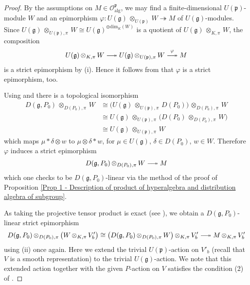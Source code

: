 \documentclass[a4paper, reqno, 10pt]{amsart}
\theoremstyle{definition}
\numberwithin{equation}{section}
\newcommand{\Ad}{{\mathrm{Ad}}}
\newcommand{\blank}{{\,\_\,}}
\newcommand{\botimes}[1]{{\,\otimes_{#1}\,}}
\renewcommand{\dim}{{\mathrm{dim}}}
\newcommand{\mto}{\mapsto}
\newcommand{\CO}{{\mathcal {O}}}
\newcommand{\Fg}{{\mathfrak {g}}}
\newcommand{\Fm}{{\mathfrak {m}}}
\newcommand{\Fp}{{\mathfrak {p}}}
\DeclareRobustCommand\longtwoheadrightarrow
{\relbar\joinrel\twoheadrightarrow}
\newcommand{\alg}{{\mathrm{alg}}}
\begin{document}
\begin{proof}
	By the assumptions on $M \in \CO^\Fp_\alg$, we may find a finite-dimensional $U(\Fp)$-module $W$ and an epimorphism $\varphi \colon U(\Fg) \botimes{U(\Fp)} W \twoheadrightarrow M$ of $U(\Fg)$-modules.
	Since $U(\Fg) \botimes{U(\Fp),\pi} W \cong U(\Fg)^{\oplus \dim_K(W)}$ is a quotient of $U(\Fg) \botimes{K,\pi} W$, the composition
	\begin{equation*}
		U(\Fg) \botimes{K,\pi} W \longtwoheadrightarrow U(\Fg) \botimes{U(\Fp),\pi} W \overset{\varphi}{\longtwoheadrightarrow} M
	\end{equation*}
	is a strict epimorphism by  (i).
	Hence it follows from \cite[Lemma 2 (3)]{KopylovKuzminov00KerCokerSeqSemiAbCat} that $\varphi$ is a strict epimorphism, too.
	
	
	Using  and  there is a  topological isomorphism
	\begin{align*}
		D(\Fg,P_0) \botimes{D(P_0),\pi} W 
		&\cong \big( U(\Fg) \botimes{U(\Fp),\pi} D(P_0) \big) \botimes{D(P_0),\pi} W  \\
		&\cong  U(\Fg) \botimes{U(\Fp),\pi} \big(D(P_0)  \botimes{D(P_0),\pi} W \big)	\\
		&\cong U(\Fg) \botimes{U(\Fp),\pi} W
	\end{align*}
	which maps $\mu \ast \delta \otimes w$ to $\mu \otimes \delta \ast w$, for $\mu \in U(\Fg)$, $\delta\in D(P_0)$, $w\in W$.
	Therefore $\varphi$ induces a strict epimorphism
	\begin{equation*}
		D(\Fg,P_0) \botimes{D(P_0),\pi} W  \longtwoheadrightarrow M
	\end{equation*}
	which one checks to be $D(\Fg,P_0)$-linear via the method of the proof of Proposition \ref{Prop 1 - Description of product of hyperalgebra and distribution algebra of subgroup}.
	
	
	As taking the projective tensor product is exact (see \cite[Lemma 2.1 (ii)]{BreuilHerzig18TowardsFinSlopePartGLn}), we obtain a $D(\Fg,P_0)$-linear strict epimorphism
	\begin{equation*}
		D(\Fg,P_0) \botimes{D(P_0),\pi} \big(  W \botimes{K,\pi} V'_b\big)  \cong \big( D(\Fg,P_0) \botimes{D(P_0),\pi} W \big) \botimes{K,\pi} V'_b \longtwoheadrightarrow M \botimes{K,\pi} V'_b 
	\end{equation*}
	using  (ii) once again.
	Here we extend the trivial $U(\Fp)$-action on $V'_b$ (recall that $V$ is a smooth representation) to the trivial $U(\Fg)$-action.
	We note that this extended action together with the given $P$-action on $V$ satisfies the condition (2) of .
	

\end{proof}
\end{document}

